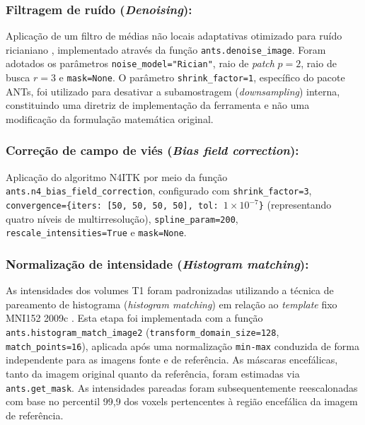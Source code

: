 \documentclass[review]{elsarticle}
\newcommand{\code}[1]{\texttt{#1}}
\begin{document}
\subsubsection{Filtragem de ruído (\emph{Denoising}):} Aplicação de um filtro de médias não locais adaptativas otimizado para ruído ricianiano \cite{manjon-2010}, implementado através da função \code{ants.denoise\_image}. Foram adotados os parâmetros \code{noise\_model="Rician"}, raio de \emph{patch} $p=2$, raio de busca $r=3$ e \code{mask=None}. O parâmetro \code{shrink\_factor=1}, específico do pacote ANTs, foi utilizado para desativar a subamostragem (\emph{downsampling}) interna, constituindo uma diretriz de implementação da ferramenta e não uma modificação da formulação matemática original.

\subsubsection{Correção de campo de viés (\emph{Bias field correction}):} Aplicação do algoritmo N4ITK \cite{tustison-2010} por meio da função \code{ants.n4\_bias\_field\_correction}, configurado com \code{shrink\_factor=3}, \code{convergence=\{iters: [50, 50, 50, 50], tol: }\(1\times10^{-7}\)\code{\}} (representando quatro níveis de multirresolução), \code{spline\_param=200}, \code{rescale\_intensities=True} e \code{mask=None}.

\subsubsection{Normalização de intensidade (\emph{Histogram matching}):} As intensidades dos volumes T1 foram padronizadas utilizando a técnica de pareamento de histograma (\emph{histogram matching}) \cite{nyul-2000} em relação ao \emph{template} fixo MNI152 2009c \cite{fonov-2011}. Esta etapa foi implementada com a função \code{ants.histogram\_match\_image2} (\code{transform\_domain\_size=128}, \code{match\_points=16}), aplicada após uma normalização \code{min-max} conduzida de forma independente para as imagens fonte e de referência. As máscaras encefálicas, tanto da imagem original quanto da referência, foram estimadas via \code{ants.get\_mask}. As intensidades pareadas foram subsequentemente reescalonadas com base no percentil 99,9 dos voxels pertencentes à região encefálica da imagem de referência. 
\end{document}
